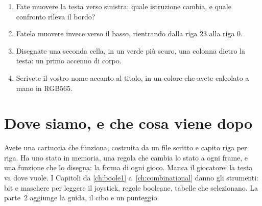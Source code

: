 \begin{exercise}[su \prg]
\begin{enumerate}[nosep]
\item Fate muovere la testa verso sinistra: quale istruzione cambia, e quale
  confronto rileva il bordo?
\item Fatela muovere invece verso il basso, rientrando dalla riga 23 alla riga 0.
\item Disegnate una seconda cella, in un verde più scuro, una colonna dietro la
  testa: un primo accenno di corpo.
\item Scrivete il vostro nome accanto al titolo, in un colore che avete
  calcolato a mano in RGB565.
\end{enumerate}
\end{exercise}

\section{Dove siamo, e che cosa viene dopo}

Avete una cartuccia che funziona, costruita da un file scritto e capito riga
per riga. Ha uno stato in memoria, una regola che cambia lo stato a ogni frame,
e una funzione che lo disegna: la forma di ogni gioco. Manca il giocatore: la
testa va dove vuole. I Capitoli da \ref{ch:boole1} a~\ref{ch:combinational}
danno gli strumenti: bit e maschere per leggere il joystick, regole booleane,
tabelle che selezionano. La parte~2 aggiunge la guida, il cibo e un punteggio.
